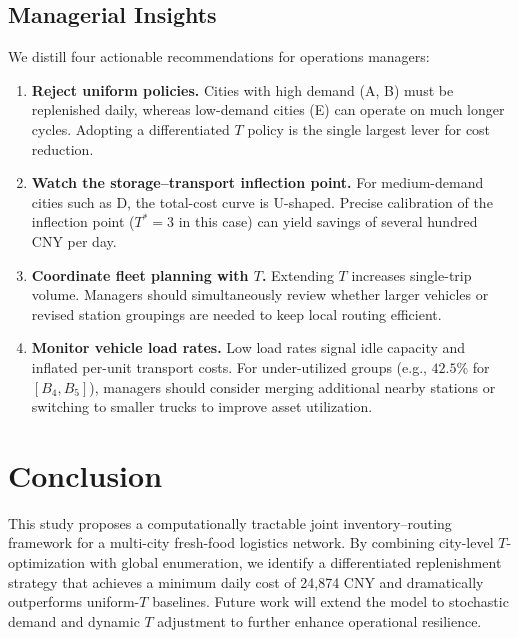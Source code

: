 \documentclass[10pt]{article}
\begin{document}
\subsection{Managerial Insights}
We distill four actionable recommendations for operations managers:
\begin{enumerate}
    \item \textbf{Reject uniform policies.} Cities with high demand (A, B) must be replenished daily, whereas low-demand cities (E) can operate on much longer cycles. Adopting a differentiated $T$ policy is the single largest lever for cost reduction.
    \item \textbf{Watch the storage--transport inflection point.} For medium-demand cities such as D, the total-cost curve is U-shaped. Precise calibration of the inflection point ($T^*=3$ in this case) can yield savings of several hundred CNY per day.
    \item \textbf{Coordinate fleet planning with $T$.} Extending $T$ increases single-trip volume. Managers should simultaneously review whether larger vehicles or revised station groupings are needed to keep local routing efficient.
    \item \textbf{Monitor vehicle load rates.} Low load rates signal idle capacity and inflated per-unit transport costs. For under-utilized groups (e.g., $42.5\%$ for $[B_4,B_5]$), managers should consider merging additional nearby stations or switching to smaller trucks to improve asset utilization.
\end{enumerate}

\section{Conclusion}
This study proposes a computationally tractable joint inventory--routing framework for a multi-city fresh-food logistics network. By combining city-level $T$-optimization with global enumeration, we identify a differentiated replenishment strategy that achieves a minimum daily cost of 24,874 CNY and dramatically outperforms uniform-$T$ baselines. Future work will extend the model to stochastic demand and dynamic $T$ adjustment to further enhance operational resilience.
\end{document}
